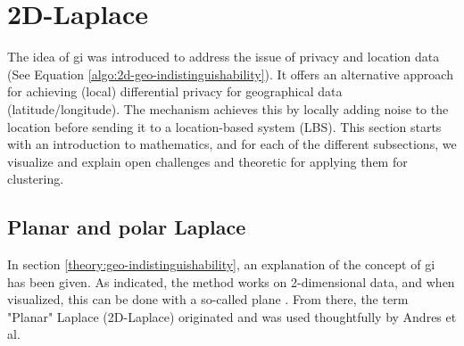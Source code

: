 %
\section{2D-Laplace}
The idea of \gls{gi} was introduced to address the issue of privacy and location data \citep{DBLP:journals/corr/abs-1212-1984} (See Equation \ref{algo:2d-geo-indistinguishability}).
It offers an alternative approach for achieving (local) differential privacy for geographical data (latitude/longitude).
The mechanism achieves this by locally adding noise to the location before sending it to a location-based system (LBS).
This section starts with an introduction to mathematics, and for each of the different subsections, we visualize and explain open challenges and theoretic for applying them for clustering.
\subsection{Planar and polar Laplace}
In section \ref{theory:geo-indistinguishability}, an explanation of the concept of \gls{gi} has been given.
As indicated, the method works on 2-dimensional data, and when visualized, this can be done with a so-called plane \citep{DBLP:journals/corr/abs-1212-1984}.
From there, the term "Planar" Laplace (2D-Laplace) originated and was used thoughtfully by Andres et al.

